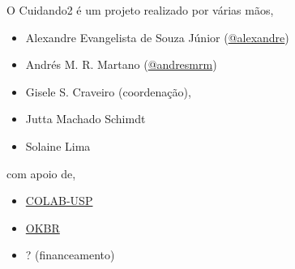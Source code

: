 \documentclass[letterpaper,10pt,english]{sphinxmanual}
\begin{document}
O Cuidando2 é um projeto realizado por várias mãos,
\begin{itemize}
\item {} 
Alexandre Evangelista de Souza Júnior
(\href{https://github.com/alexandre}{@alexandre})

\item {} 
Andrés M. R. Martano (\href{https://github.com/andresmrm}{@andresmrm})

\item {} 
Gisele S. Craveiro (coordenação),

\item {} 
Jutta Machado Schimdt

\item {} 
Solaine Lima

\end{itemize}

com apoio de,
\begin{itemize}
\item {} 
\href{http://colab.each.usp.br/}{COLAB-USP}

\item {} 
\href{http://br.okfn.org/}{OKBR}

\item {} 
? (financeamento)

\end{itemize}
\end{document}
